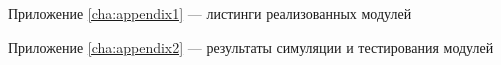 \begin{appendixes}
	Приложение \ref{cha:appendix1} ---  листинги реализованных модулей
	
	Приложение \ref{cha:appendix2} --- результаты симуляции и тестирования модулей
\end{appendixes}
